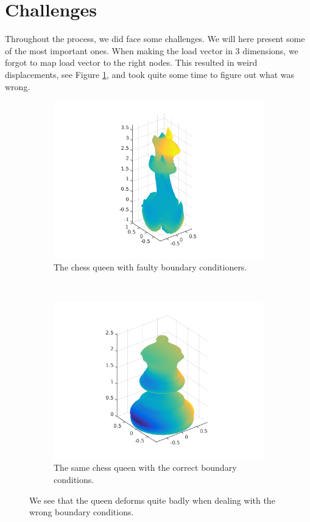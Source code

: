 \section{Challenges}
Throughout the process, we did face some challenges. We will here present some of the most important ones. When making the load vector in 3 dimensions, we forgot to map load vector to the right nodes. This resulted in weird displacements, see Figure \ref{fig:queens}, and took quite some time to figure out what was wrong. 
\begin{figure}[ht]
        \centering
        \begin{subfigure}[b]{0.45 \textwidth}
                \includegraphics[width=\textwidth]{queen_broken}
                \caption{The chess queen with faulty boundary conditioners.}
        \end{subfigure}
        ~
        \begin{subfigure}[b]{0.45 \textwidth}
                \includegraphics[width=\textwidth]{queen_fixed}
                \caption{The same chess queen with the correct boundary conditions.}
        \end{subfigure}
        \caption{We see that the queen deforms quite badly when dealing with the wrong boundary conditions. }
        \label{fig:queens}
\end{figure}

